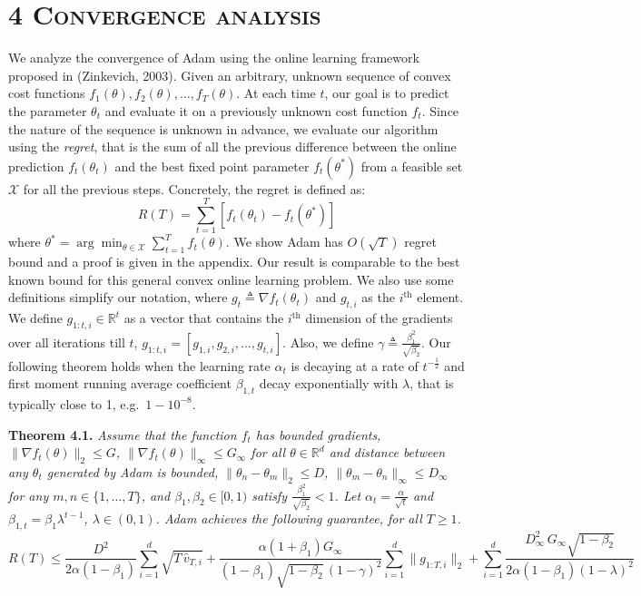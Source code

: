 \documentclass[11pt]{article}
\begin{document}
\section*{4 \textsc{Convergence analysis}}

We analyze the convergence of Adam using the online learning
framework proposed in (Zinkevich, 2003). Given an arbitrary,
unknown sequence of convex cost functions
$f_1(\theta), f_2(\theta), \ldots, f_T(\theta)$. At each time $t$,
our goal is to predict the parameter $\theta_t$ and evaluate it on
a previously unknown cost function $f_t$. Since the nature of the
sequence is unknown in advance, we evaluate our algorithm using
the \emph{regret}, that is the sum of all the previous difference
between the online prediction $f_t(\theta_t)$ and the best fixed
point parameter $f_t(\theta^*)$ from a feasible set $\mathcal{X}$
for all the previous steps. Concretely, the regret is defined as:
%
\begin{equation}
R(T) = \sum_{t=1}^{T} [f_t(\theta_t) - f_t(\theta^*)]
\end{equation}
%
where $\theta^* = \arg\min_{\theta \in \mathcal{X}} \sum_{t=1}^{T} f_t(\theta)$.
We show Adam has $O(\sqrt{T})$ regret bound and a proof is given
in the appendix. Our result is comparable to the best known bound
for this general convex online learning problem. We also use some
definitions simplify our notation, where
$g_t \triangleq \nabla f_t(\theta_t)$ and $g_{t,i}$ as the
$i^\text{th}$ element. We define
$g_{1:t,i} \in \mathbb{R}^t$ as a vector that contains the
$i^\text{th}$ dimension of the gradients over all iterations till
$t$, $g_{1:t,i} = [g_{1,i}, g_{2,i}, \ldots, g_{t,i}]$. Also, we
define $\gamma \triangleq \frac{\beta_1^2}{\sqrt{\beta_2}}$. Our
following theorem holds when the learning rate $\alpha_t$ is
decaying at a rate of $t^{-\frac{1}{2}}$ and first moment running
average coefficient $\beta_{1,t}$ decay exponentially with
$\lambda$, that is typically close to 1, e.g.\
$1 - 10^{-8}$.

\vspace{0.5em}

\noindent\textbf{Theorem 4.1.} \emph{Assume that the function
$f_t$ has bounded gradients,
$\|\nabla f_t(\theta)\|_2 \leq G$,
$\|\nabla f_t(\theta)\|_\infty \leq G_\infty$ for all
$\theta \in \mathbb{R}^d$ and distance between any $\theta_t$
generated by Adam is bounded,
$\|\theta_n - \theta_m\|_2 \leq D$,
$\|\theta_m - \theta_n\|_\infty \leq D_\infty$ for any
$m, n \in \{1, \ldots, T\}$, and $\beta_1, \beta_2 \in [0, 1)$
satisfy $\frac{\beta_1^2}{\sqrt{\beta_2}} < 1$. Let
$\alpha_t = \frac{\alpha}{\sqrt{t}}$ and
$\beta_{1,t} = \beta_1 \lambda^{t-1}$, $\lambda \in (0, 1)$.
Adam achieves the following guarantee, for all $T \geq 1$.}
%
\[
R(T) \leq \frac{D^2}{2\alpha(1 - \beta_1)}
          \sum_{i=1}^{d} \sqrt{T \, \widehat{v}_{T,i}}
        + \frac{\alpha(1 + \beta_1) G_\infty}
               {(1 - \beta_1)\sqrt{1 - \beta_2}\,(1 - \gamma)^2}
          \sum_{i=1}^{d} \|g_{1:T,i}\|_2
        + \sum_{i=1}^{d}
          \frac{D_\infty^2 \, G_\infty \sqrt{1 - \beta_2}}
               {2\alpha(1 - \beta_1)(1 - \lambda)^2}
\]
\end{document}
